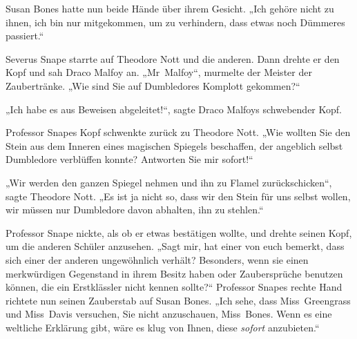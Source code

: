 Susan Bones hatte nun beide Hände über ihrem Gesicht. „Ich gehöre nicht zu ihnen, ich bin nur mitgekommen, um zu verhindern, dass etwas noch Dümmeres passiert.“

Severus Snape starrte auf Theodore Nott und die anderen. Dann drehte er den Kopf und sah Draco Malfoy an. „Mr~Malfoy“, murmelte der Meister der Zaubertränke.
„Wie sind Sie auf Dumbledores Komplott gekommen?“

„Ich habe es aus Beweisen abgeleitet!“, sagte Draco Malfoys schwebender Kopf.

Professor Snapes Kopf schwenkte zurück zu Theodore Nott.
„Wie wollten Sie den Stein aus dem Inneren eines magischen Spiegels beschaffen, der angeblich selbst Dumbledore verblüffen konnte? Antworten Sie mir sofort!“

„Wir werden den ganzen Spiegel nehmen und ihn zu Flamel zurückschicken“, sagte Theodore Nott. „Es ist ja nicht so, dass wir den Stein für uns selbst wollen, wir müssen nur Dumbledore davon abhalten, ihn zu stehlen.“

Professor Snape nickte, als ob er etwas bestätigen wollte, und drehte seinen Kopf, um die anderen Schüler anzusehen.
„Sagt mir, hat einer von euch bemerkt, dass sich einer der anderen ungewöhnlich verhält? Besonders, wenn sie einen merkwürdigen Gegenstand in ihrem Besitz haben oder Zaubersprüche benutzen können, die ein Erstklässler nicht kennen sollte?“
Professor Snapes rechte Hand richtete nun seinen Zauberstab auf Susan Bones.
„Ich sehe, dass Miss~Greengrass und Miss~Davis versuchen, Sie nicht anzuschauen, Miss~Bones. Wenn es eine weltliche Erklärung gibt, wäre es klug von Ihnen, diese \emph{sofort} anzubieten.“

